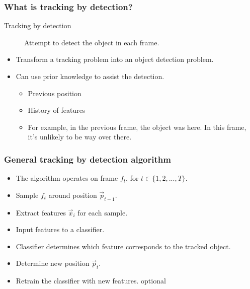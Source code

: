 \begin{frame}
    \frametitle{What is tracking by detection?}
    \begin{description}
        \item [Tracking by detection] Attempt to detect the object in each frame.
    \end{description}
    \begin{itemize}
        \item Transform a tracking problem into an object detection problem.
        \item Can use prior knowledge to assist the detection.
            \begin{itemize}
                \item Previous position
                \item History of features
                \item For example, in the previous frame, the object was here. In this frame, it's
                    unlikely to be way over there.
            \end{itemize}
    \end{itemize}
\end{frame}

\begin{frame}
    \frametitle{General tracking by detection algorithm}
    \begin{itemize}
        \item The algorithm operates on frame \(f_t\), for \(t \in \{1, 2, ..., T\}\).
        \item Sample \(f_t\) around position \(\vec{p}_{t-1}\).
        \item Extract features \(\vec{x}_i\) for each sample.
        \item Input features to a classifier.
        \item Classifier determines which feature corresponds to the tracked object.
        \item Determine new position \(\vec{p}_t\).
        \item Retrain the classifier with new features. \alert{optional}
    \end{itemize}
\end{frame}


